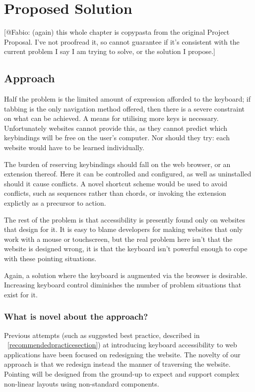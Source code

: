 \documentclass[a4paper, 12pt]{report}
\begin{document}
\section{Proposed Solution}
[@Fabio: (again) this whole chapter is copypasta from the original Project Proposal. I've not proofread it, so cannot guarantee if it's consistent with the current problem I say I am trying to solve, or the solution I propose.]
\subsection{Approach}
Half the problem is the limited amount of expression afforded to the keyboard; if tabbing is the only navigation method offered, then there is a severe constraint on what can be achieved. A means for utilising more keys is necessary. Unfortunately websites cannot provide this, as they cannot predict which \glspl{keybinding} will be free on the user's computer. Nor should they try: each website would have to be learned individually.

The burden of reserving \glspl{keybinding} should fall on the web browser, or an extension thereof. Here it can be controlled and configured, as well as uninstalled should it cause conflicts. A novel shortcut scheme would be used to avoid conflicts, such as sequences rather than chords, or invoking the extension explictly as a precursor to action.

The rest of the problem is that accessibility is presently found only on websites that design for it. It is easy to blame developers for making websites that only work with a mouse or touchscreen, but the real problem here isn't that the website is designed wrong, it is that the keyboard isn't powerful enough to cope with these pointing situations.

Again, a solution where the keyboard is augmented via the browser is desirable. Increasing keyboard control diminishes the number of problem situations that exist for it.

\subsubsection{What is novel about the approach?}
Previous attempts (such as suggested best practice, described in ~\cref{recommendedpracticesection}) at introducing keyboard accessibility to web applications have been focused on redesigning the website. The novelty of our approach is that we redesign instead the manner of traversing the website. Pointing will be designed from the ground-up to expect and support complex non-linear layouts using non-standard components.
\end{document}
